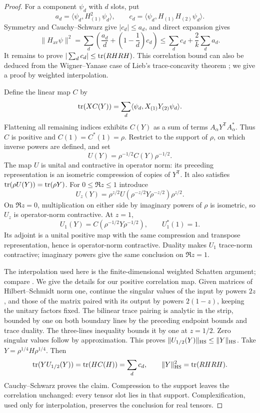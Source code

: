 \begin{proof}
For a component $\psi_d$ with $d$ slots, put
\[
 a_d=\langle\psi_d,H_{(1)}^2\psi_d\rangle,
 \qquad c_d=\langle\psi_d,H_{(1)}H_{(2)}\psi_d\rangle.
\]
Symmetry and Cauchy--Schwarz give $|c_d|\le a_d$, and direct expansion gives
\[
 \|H_{\mathrm{av}}\psi\|^2
 =\sum_d\left(\frac{a_d}{d}+\left(1-\frac1d\right)c_d\right)
 \le\sum_d c_d+\frac2k\sum_d a_d.
\]
It remains to prove $|\sum_d c_d|\le\operatorname{tr}(RHRH)$.  This correlation bound
can also be deduced from the Wigner--Yanase case of Lieb's trace-concavity
theorem \cite{Lieb1973}; we give a proof by weighted interpolation.

Define the linear map $C$ by
\[
 \operatorname{tr}(XC(Y))=\sum_d\langle\psi_d,X_{(1)}Y_{(2)}\psi_d\rangle.
\]
Flattening all remaining indices exhibits $C(Y)$ as a sum of terms
$A_\alpha Y^{\mathsf T}A_\alpha^*$.  Thus $C$ is positive and
$C(1)=C^*(1)=\rho$.  Restrict to the support of $\rho$, on which inverse
powers are defined, and set
\[
 U(Y)=\rho^{-1/2}C(Y)\rho^{-1/2}.
\]
The map $U$ is unital and contractive in operator norm: its preceding
representation is an isometric compression of copies of $Y^{\mathsf T}$.
It also satisfies $\operatorname{tr}(\rho U(Y))=\operatorname{tr}(\rho Y)$.
For $0\le\Re z\le1$ introduce
\[
 U_z(Y)=\rho^{z/2}
 U(\rho^{-z/2}Y\rho^{-z/2})\rho^{z/2}.
\]
On $\Re z=0$, multiplication on either side by imaginary powers of $\rho$
is isometric, so $U_z$ is operator-norm contractive.  At $z=1$,
\[
 U_1(Y)=C(\rho^{-1/2}Y\rho^{-1/2}),\qquad U_1^*(1)=1.
\]
Its adjoint is a unital positive map with the same compression and
transpose representation, hence is operator-norm contractive.  Duality
makes $U_1$ trace-norm contractive; imaginary powers give the same
conclusion on $\Re z=1$.

The interpolation used here is the finite-dimensional weighted Schatten
argument; compare \cite[Section~III, Theorem~4]{Beigi2013}.  We give the details for
our positive correlation map.
Given matrices of Hilbert--Schmidt norm one, continue the singular values
of the input by powers $2z$, and those of the matrix paired with its
output by powers $2(1-z)$, keeping the unitary factors fixed.  The bilinear
trace pairing is analytic in the strip, bounded by one on both boundary
lines by the preceding endpoint bounds and trace duality.  The three-lines
inequality bounds it by one at $z=1/2$.  Zero singular values follow by
approximation.  This proves $\|U_{1/2}(Y)\|_{\mathrm{HS}}\le\|Y\|_{\mathrm{HS}}$.
Take $Y=\rho^{1/4}H\rho^{1/4}$.  Then
\[
 \operatorname{tr}(YU_{1/2}(Y))=\operatorname{tr}(HC(H))=\sum_d c_d,
 \qquad \|Y\|_{\mathrm{HS}}^2=\operatorname{tr}(RHRH).
\]
Cauchy--Schwarz proves the claim.  Compression to the support leaves the
correlation unchanged: every tensor slot lies in that support.  Complexification, used
only for interpolation, preserves the conclusion for real tensors.
\end{proof}

